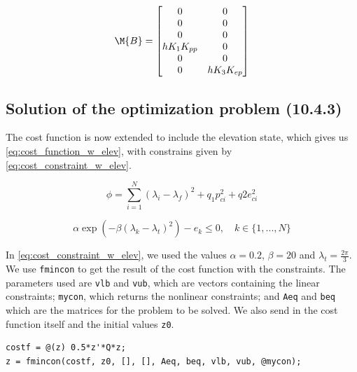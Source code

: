 \begin{equation}\label{eq:matrix_4.2_B}
	\M{B} =
	\begin{bmatrix}
		0				& 0				\\
		0				& 0				\\
		0				& 0				\\
		hK_{1}K_{pp}	& 0				\\
		0				& 0				\\
		0				& hK_{3}K_{ep}	\\
	\end{bmatrix}
\end{equation}

\subsection{Solution of the optimization problem (10.4.3)}

The cost function is now extended to include the elevation state, which gives us \eqref{eq:cost_function_w_elev}, with constrains given by \eqref{eq:cost_constraint_w_elev}. 

\begin{equation} \label {eq:cost_function_w_elev}
	\phi = \sum\limits_{i=1}^N (\lambda_i - \lambda_f)^2 + q_1 p_{ci}^2 + q2 e_{ci}^2
\end{equation}

\begin{equation} \label{eq:cost_constraint_w_elev}
	\alpha \exp (-\beta (\lambda_k - \lambda_t)^2) -e_k \leq 0, \quad k \in \{ 1, ..., N \}
\end{equation}

In \eqref{eq:cost_constraint_w_elev}, we used the values $\alpha = 0.2$, $\beta = 20$ and $\lambda_t = \frac{2 \pi}{3}$.
We use \texttt{fmincon} to get the result of the cost function with the constraints. The parameters used are  \texttt{vlb} and \texttt{vub}, which are vectors containing the linear constraints; \texttt{mycon}, which returns the nonlinear constraints; and \texttt{Aeq} and \texttt{beq} which are the matrices for the problem to be solved. We also send in the cost function itself and the initial values \texttt{z0}.
\begin{lstlisting}
costf = @(z) 0.5*z'*Q*z;
z = fmincon(costf, z0, [], [], Aeq, beq, vlb, vub, @mycon);
\end{lstlisting}

